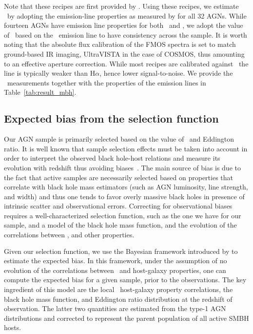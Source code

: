 \documentclass[apj]{emulateapj}
\begin{document}
Note that these recipes are first provided by \citet{Vestergaard2006}. Using these recipes, we estimate \mbh\ by adopting the emission-line properties as measured by \citet{Schulze2018} for all 32 AGNs. While fourteen AGNs have emission line properties for both \halpha\ and \hbeta, we adopt the value of \mbh\ based on the \halpha\ emission line to have consistency across the sample. It is worth noting that the absolute flux calibration of the FMOS spectra is set to match ground-based IR imaging, UltraVISTA in the case of COSMOS, thus amounting to an effective aperture correction. While most recipes are calibrated against \hbeta\, the line is typically weaker than H$\alpha$, hence lower signal-to-noise. We provide the \mbh\ measurements together with the properties of the emission lines in Table~\ref{tab:result_mbh}. 


\subsection{Expected bias from the selection function}

\label{sec:sf_framework}

Our AGN sample is primarily selected based on the value of \mbh~and Eddington ratio. It is well known that sample selection effects must be taken into account in order to  interpret the observed black hole-host relations and measure its evolution with redshift thus avoiding biases~\citep{Tre++07,Schulze2011,Bennert++2011, Schulze2014,Park15}. The main source of bias is due to the fact that active samples are necessarily selected based on properties that correlate with black hole mass estimators (such as AGN luminosity, line strength, and width) and thus one tends to favor overly massive black holes in presence of intrinsic scatter and observational errors. Correcting for observational biases requires a well-characterized selection function, such as the one we have for our sample, and a model of the black hole mass function, and the evolution of the correlations between \mbh, and other properties.

Given our selection function, we use the Bayesian framework introduced by \citet{Schulze2011,Schulze2014} to estimate the expected bias. In this framework, under the assumption of no evolution of the correlations between \mbh\ and host-galaxy properties, one can compute the expected bias for a given sample, prior to the observations. The key ingredient of this model are the local \mbh\ host-galaxy property correlations, the black hole mass function, and Eddington ratio distribution at the redshift of observation. The latter two quantities are estimated from the type-1 AGN distributions \citep{Schulze2015} and corrected to represent the parent population of all active SMBH hosts. %
\end{document}
